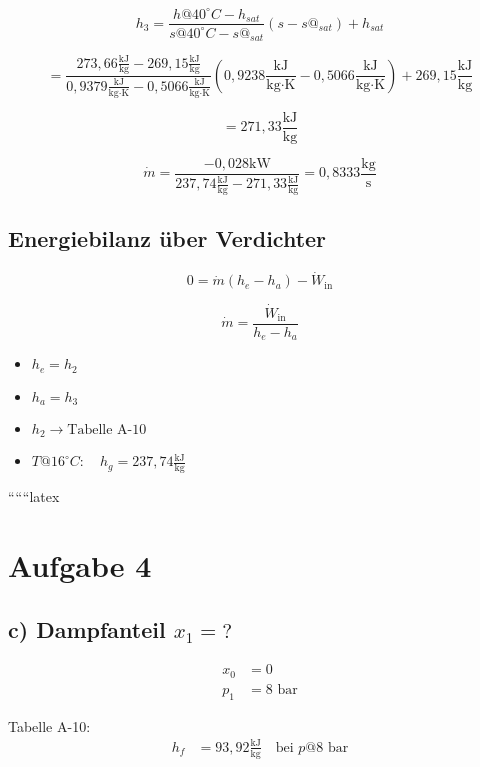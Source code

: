\[
h_3 = \frac{h@40^\circ C - h_{sat}}{s@40^\circ C - s@_{sat}} (s - s@_{sat}) + h_{sat}
\]

\[
= \frac{273,66 \frac{\text{kJ}}{\text{kg}} - 269,15 \frac{\text{kJ}}{\text{kg}}}{0,9379 \frac{\text{kJ}}{\text{kg} \cdot \text{K}} - 0,5066 \frac{\text{kJ}}{\text{kg} \cdot \text{K}}} (0,9238 \frac{\text{kJ}}{\text{kg} \cdot \text{K}} - 0,5066 \frac{\text{kJ}}{\text{kg} \cdot \text{K}}) + 269,15 \frac{\text{kJ}}{\text{kg}}
\]

\[
= 271,33 \frac{\text{kJ}}{\text{kg}}
\]

\[
\dot{m} = \frac{-0,028 \text{kW}}{237,74 \frac{\text{kJ}}{\text{kg}} - 271,33 \frac{\text{kJ}}{\text{kg}}} = 0,8333 \frac{\text{kg}}{\text{s}}
\]

\subsection*{Energiebilanz über Verdichter}

\[
0 = \dot{m} (h_e - h_a) - \dot{W}_{\text{in}}
\]

\[
\dot{m} = \frac{\dot{W}_{\text{in}}}{h_e - h_a}
\]

\begin{itemize}
    \item $h_e = h_2$
    \item $h_a = h_3$
    \item $h_2 \rightarrow \text{Tabelle A-10}$
    \item $T@16^\circ C: \quad h_g = 237,74 \frac{\text{kJ}}{\text{kg}}$
\end{itemize}

``````latex


\section*{Aufgabe 4}

\subsection*{c) Dampfanteil $x_1 = ?$}

\begin{align*}
x_0 &= 0 \\
p_1 &= 8 \text{ bar}
\end{align*}

Tabelle A-10:
\begin{align*}
h_f &= 93{,}92 \frac{\text{kJ}}{\text{kg}} \quad \text{bei } p @ 8 \text{ bar}
\end{align*}

